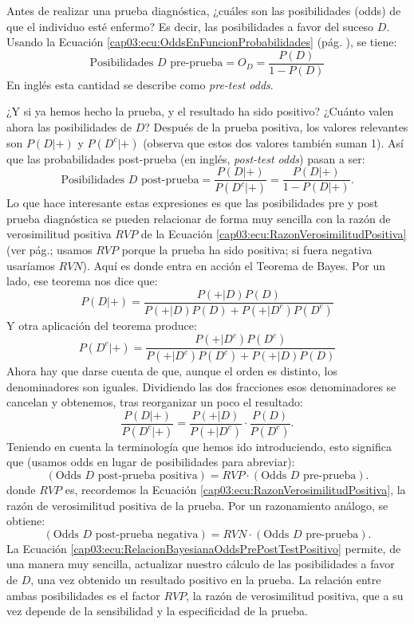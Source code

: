 Antes de realizar una prueba diagnóstica, ¿cuáles son las posibilidades (odds) de que el individuo esté enfermo? Es decir, las posibilidades a favor del suceso $D$. Usando la Ecuación \ref{cap03:ecu:OddsEnFuncionProbabilidades} (pág. \pageref{cap03:ecu:OddsEnFuncionProbabilidades}), se tiene:
\[\mbox{Posibilidades $D$ pre-prueba}=O_D=\dfrac{P(D)}{1-P(D)}\]
En inglés esta cantidad se describe como {\em pre-test odds}.

¿Y si ya hemos hecho la prueba, y el resultado ha sido positivo? ¿Cuánto valen ahora las posibilidades de $D$? Después de la prueba positiva, los valores relevantes son $P(D|+)$ y $P(D^c|+)$ (observa que estos dos valores también suman 1). Así que las probabilidades post-prueba (en inglés, {\em post-test odds})  pasan a ser:
\[\mbox{Posibilidades $D$ post-prueba}= \dfrac{P(D|+)}{P(D^c|+)}=\dfrac{P(D|+)}{1-P(D|+)}.\]
Lo que hace interesante estas expresiones es que las posibilidades pre y post prueba diagnóstica se pueden relacionar de forma muy sencilla con la razón de verosimilitud positiva $RVP$ de la Ecuación \ref{cap03:ecu:RazonVerosimilitudPositiva} (ver pág.\pageref{cap03:ecu:RazonVerosimilitudPositiva}; usamos $RVP$ porque la prueba ha sido positiva; si fuera negativa usaríamos $RVN$). Aquí es donde entra en acción el Teorema de Bayes. Por un lado, ese teorema nos dice que:
\[
P(D|+)=\dfrac{P(+|D)P(D)}{P(+|D)P(D)+P(+|D^c)P(D^c)}
\]
Y otra aplicación del teorema produce:
\[
P(D^c|+)=\dfrac{P(+|D^c)P(D^c)}{P(+|D^c)P(D^c)+P(+|D)P(D)}
\]
Ahora hay que darse cuenta de que, aunque el orden es distinto, los denominadores son iguales. Dividiendo las dos fracciones esos denominadores se cancelan y obtenemos, tras reorganizar un poco el resultado:
\[
\dfrac{P(D|+)}{P(D^c|+)}=\dfrac{P(+|D)}{P(+|D^c)}\cdot\dfrac{P(D)}{P(D^c)}.
\]
Teniendo en cuenta la terminología que hemos ido introduciendo, esto significa que (usamos odds en lugar de posibilidades para abreviar):
\begin{equation}\label{cap03:ecu:RelacionBayesianaOddsPrePostTestPositivo}
\left(\mbox{Odds $D$ post-prueba positiva}\right)=RVP\cdot \left(\mbox{Odds $D$ pre-prueba}\right).
\end{equation}
donde $RVP$ es, recordemos la Ecuación \ref{cap03:ecu:RazonVerosimilitudPositiva}, la razón de verosimilitud positiva de la prueba. Por un razonamiento análogo, se obtiene:
\begin{equation}\label{cap03:ecu:RelacionBayesianaOddsPrePostTestNegativo}
\left(\mbox{Odds $D$ post-prueba negativa}\right)=RVN\cdot \left(\mbox{Odds $D$ pre-prueba}\right).
\end{equation}
La Ecuación \ref{cap03:ecu:RelacionBayesianaOddsPrePostTestPositivo} permite, de una manera muy sencilla, actualizar nuestro cálculo de las posibilidades a favor de $D$, una vez obtenido un resultado positivo en la prueba. La relación entre ambas posibilidades es el factor $RVP$, la razón de verosimilitud positiva, que a su vez depende de la sensibilidad y la especificidad de la prueba.

